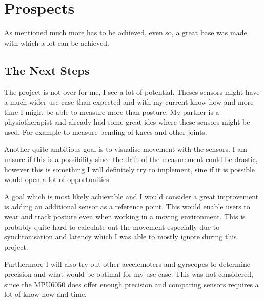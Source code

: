 \chapter*{Prospects}
\label{chap:Porspects}
\setcounter{section}{0}

As mentioned much more has to be achieved, even so, a great base was made with which a lot can be achieved. 

\section{The Next Steps}

The project is not over for me, I see a lot of potential. Theses sensors might have a much wider use case than expected and with my current know-how and more time I might be able to measure more than posture. My partner is a physiotherapist and already had some great ides where these sensors might be used. For example to measure bending of knees and other joints. 

Another quite ambitious goal is to visualise movement with the sensors. I am unsure if this is a possibility since the drift of the measurement could be drastic, however this is something I will definitely try to implement, sine if it is possible would open a lot of opportunities.

A goal which is most likely achievable and I would consider a great improvement is adding an additional sensor as a reference point. This would enable users to wear and track posture even when working in a moving environment. This is probably quite hard to calculate out the movement especially due to synchronisation and latency which I was able to mostly ignore during this project.

Furthermore I will also try out other accelemoters and gyrscopes to determine precision and what would be optimal for my use case. This was not considered, since the MPU6050 does offer enough precision and comparing sensors requires a lot of know-how and time.